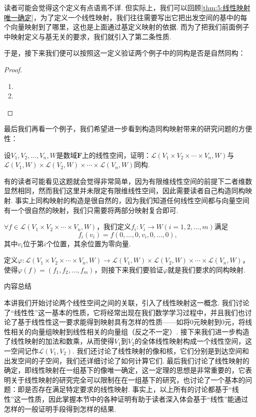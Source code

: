 读者可能会觉得这个定义有点语焉不详. 但实际上，我们可以回顾\autoref{thm:5:线性映射唯一确定}，为了定义一个线性映射，我们往往需要写出它把出发空间的基中的每个向量映射到了哪里，这也是上面通过基定义映射的依据. 而为了把我们前面例子中映射定义与基无关的要求，我们就引入了第二条性质.

于是，接下来我们便可以按照这一定义验证两个例子中的同构是否是自然同构：
\begin{proof}
    \begin{enumerate}
        \item
        \item
    \end{enumerate}
\end{proof}

最后我们再看一个例子，我们希望进一步看到构造同构映射带来的研究问题的方便性：
\begin{example}
    设$V_1,V_2,\ldots,V_n,W$是数域$\mathbf{F}$上的线性空间，证明：$\mathcal{L}(V_1 \times V_2 \times \cdots \times V_n,W)$与$\mathcal{L}(V_1,W) \times \mathcal{L}(V_2,W) \times \cdots \times \mathcal{L}(V_n,W)$同构.
\end{example}
有的读者可能看见这题就会觉得非常简单，因为有限维线性空间的前提下二者维数显然相同，然而我们这里并未限定有限维线性空间，因此需要读者自己构造同构映射. 事实上同构映射的构造是很自然的，因为我们知道任何线性空间都与向量空间有一个很自然的映射，我们只需要将两部分映射复合即可.

\begin{solution}
    $\forall f\in \mathcal{L}(V_1 \times V_2 \times \cdots \times V_n,W)$，我们定义$f_i:V_i\to W(i=1,2,\ldots,m)$满足
    \[f_i(v_i)=f(0,\ldots,0,v_i,0,\ldots,0),\]
    其中$v_i$位于第$i$个位置，其余位置为零向量.

    定义$\varphi:\mathcal{L}(V_1 \times V_2 \times \cdots \times V_n,W)\to \mathcal{L}(V_1,W) \times \mathcal{L}(V_2,W) \times \cdots \times \mathcal{L}(V_n,W)$，使得$\varphi(f)=(f_1,f_2,\ldots,f_m)$，则接下来我们要验证$\varphi$就是我们要求的同构映射.
\end{solution}

\vspace{2ex}
\centerline{\heiti \Large 内容总结}

本讲我们开始讨论两个线性空间之间的关联，引入了线性映射这一概念. 我们讨论了``线性性''这一基本的性质，它将经常出现在我们数学学习过程中，并且我们也讨论了基于线性性这一要求能得到映射具有怎样的性质——如将0元映射到0元，将线性相关的向量组映射到线性相关的向量组（反之不一定）. 接下来我们进一步构造了线性映射的加法和数乘，从而使得$V_1$到$V_2$的全体线性映射构成一个线性空间，这一空间记作$\mathcal{L}(V_1,V_2)$. 我们还讨论了线性映射的像和核，它们分别是到达空间和出发空间的子空间，我们还详细讨论了如何计算它们. 最后我们讨论了线性映射的确定，即线性映射在一组基下的像唯一确定，这一定理的思想是非常重要的，它表明关于线性映射的研究完全可以限制在在一组基下的研究，也讨论了一个基本的问题：即是否存在满足特定要求的线性映射. 事实上，以上所有的讨论都基于``线性''这一性质，因此掌握本节中的各种证明有助于读者深入体会基于``线性''能通过怎样的一般证明手段得到怎样的结果.

